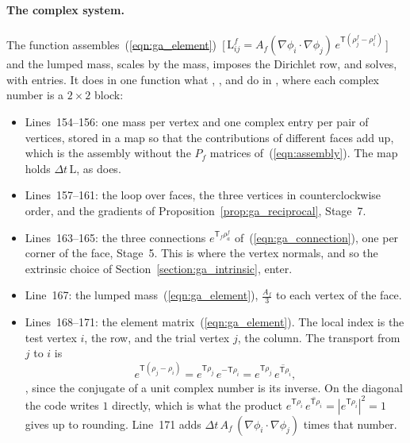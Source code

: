\paragraph{The complex system.} The function  assembles~(\ref{eqn:ga_element})~[\,$\mathrm L^f_{ij} = A_f(\nabla\phi_i\cdot\nabla\phi_j)\, e^{\mathsf T(\rho_j^f - \rho_i^f)}$\,] and the lumped mass, scales by the mass, imposes the Dirichlet row, and solves, with  entries. It does in one function what , ,  and  do in , where each complex number is a $2 \times 2$ block:

\begin{itemize}
\item Lines~154--156: one mass per vertex and one complex entry per pair of vertices, stored in a map so that the contributions of different faces add up, which is the assembly without the $P_f$ matrices of~(\ref{eqn:assembly}). The map holds $\Delta t\,\mathrm L$, as  does.
\item Lines~157--161: the loop over faces, the three vertices in counterclockwise order, and the gradients of Proposition~\ref{prop:ga_reciprocal}, Stage~7.
\item Lines~163--165: the three connections $e^{\mathsf T_f\rho_a^f}$ of~(\ref{eqn:ga_connection}), one per corner of the face, Stage~5. This is where the vertex normals, and so the extrinsic choice of Section~\ref{section:ga_intrinsic}, enter.
\item Line~167: the lumped mass~(\ref{eqn:ga_element}), $\frac{A_f}{3}$ to each vertex of the face.
\item Lines~168--171: the element matrix~(\ref{eqn:ga_element}). The local index  is the test vertex $i$, the row, and  the trial vertex $j$, the column. The transport from $j$ to $i$ is
\begin{equation*}
e^{\mathsf T(\rho_j - \rho_i)} = e^{\mathsf T\rho_j}\, e^{-\mathsf T\rho_i} = e^{\mathsf T\rho_j}\,\overline{e^{\mathsf T\rho_i}} ,
\end{equation*}
, since the conjugate of a unit complex number is its inverse. On the diagonal the code writes $1$ directly, which is what the product $e^{\mathsf T\rho_i}\,\overline{e^{\mathsf T\rho_i}} = |e^{\mathsf T\rho_i}|^2 = 1$ gives up to rounding. Line~171 adds $\Delta t\, A_f\,(\nabla\phi_i\cdot\nabla\phi_j)$ times that number.

\end{itemize}

